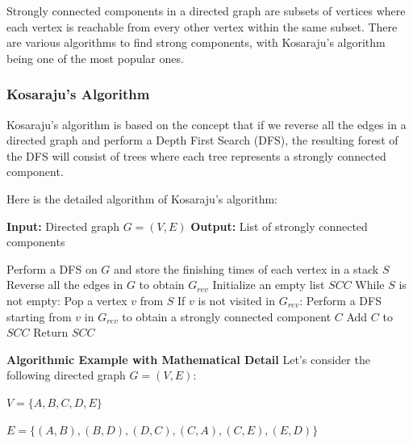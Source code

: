 \documentclass[12pt]{book} %
\begin{document}
Strongly connected components in a directed graph are subsets of vertices where each vertex is reachable from every other vertex within the same subset. There are various algorithms to find strong components, with Kosaraju's algorithm being one of the most popular ones.

\subsubsection{Kosaraju's Algorithm}

Kosaraju's algorithm is based on the concept that if we reverse all the edges in a directed graph and perform a Depth First Search (DFS), the resulting forest of the DFS will consist of trees where each tree represents a strongly connected component.

Here is the detailed algorithm of Kosaraju's algorithm:
\FloatBarrier
\begin{algorithm}
\caption{Kosaraju's Algorithm}
\begin{algorithmic}

\State \textbf{Input:} Directed graph $G = (V, E)$
\State \textbf{Output:} List of strongly connected components

\State Perform a DFS on $G$ and store the finishing times of each vertex in a stack $S$
\State Reverse all the edges in $G$ to obtain $G_{rev}$
\State Initialize an empty list $SCC$
\State While $S$ is not empty:
\State \quad Pop a vertex $v$ from $S$
\State \quad If $v$ is not visited in $G_{rev}$:
\State \quad \quad Perform a DFS starting from $v$ in $G_{rev}$ to obtain a strongly connected component $C$
\State \quad \quad Add $C$ to $SCC$
\State Return $SCC$

\end{algorithmic}
\end{algorithm}
\FloatBarrier
\textbf{Algorithmic Example with Mathematical Detail}
\FloatBarrier
Let's consider the following directed graph $G = (V, E)$:

$V = \{A, B, C, D, E\}$

$E = \{(A, B), (B, D), (D, C), (C, A), (C, E), (E, D)\}$
\end{document}
